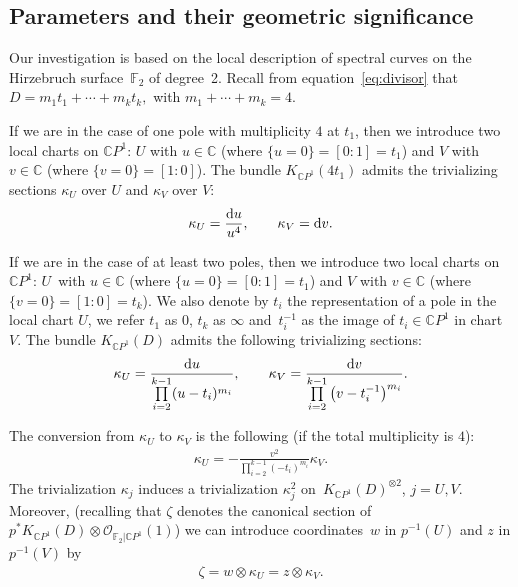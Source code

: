 \documentclass[10pt,a4paper]{amsart}
\newcommand{\C}{{\mathbb C}} %
\renewcommand{\O}{{\mathcal O}} %
\newcommand{\CP}[1]{\mathbb{C}P^{#1}} %
\renewcommand{\d}{{\rm d}} %
\numberwithin{equation}{section}
\begin{document}
\subsection{Parameters and their geometric significance}\label{ssec:param_geo}
Our investigation is based on the local description of spectral
curves on the Hirzebruch surface~{${\mathbb {F}}_2$} of degree~2.
Recall from equation~\eqref{eq:divisor} that
$D = m_1 t_1 + \cdots + m_k t_k,$ with $ m_1 + \cdots + m_k = 4$.

If we are in the case of one pole with multiplicity $4$ {at
 $t_1$}, then we introduce two local charts on $\CP{1}$: $U$ with $u\in
\C$ (where $\{u=0\}=[0:1]=t_1$) and $V$ with $v \in \C$ (where $\{
v=0\}=[1:0]$). The bundle $K_{\CP{1}}(4t_1)$ admits the trivializing
sections $\kappa_U$ over $U$ and $\kappa_V$ over $V$:
\begin{align*}
 \kappa_U = \frac{\d u}{u^4}, \qquad 	\kappa_V = \d v.
\end{align*}

If we are in the case of at least two poles, then we introduce
 two local charts on $\CP{1}$: $U$~with $u\in \C$ (where
 $\{u=0\}=[0:1]=t_1$) and $V$ with $v \in \C$ (where $\{
 v=0\}=[1:0]=t_k$). We also denote by $t_i$ the representation
	of a pole in the local chart $U$, we refer $t_1$ as $0$, $t_k$ as
	$\infty$ and~$t_i^{-1}$ as the image of $t_i\in\CP{1}$ in chart $V$.
	The bundle $K_{\CP{1}}(D)$ admits the following
 trivializing sections:
\begin{gather*}
 \kappa_U = \frac{\d u}{\prod\limits_{i=2}^{k-1}(u-t_i)^{m_i}}, \qquad
	\kappa_V = \frac{\d v}{\prod\limits_{i=2}^{k-1}\big(v-t_i^{-1}\big)^{m_i}}.
\end{gather*}

The conversion from $\kappa_U$ to $\kappa_V$ is the following (if the total multiplicity is $4$):
\begin{gather*}
	{\kappa_U=-\frac{v^2}{\prod\limits_{i=2}^{k-1}(-t_i)^{m_i}} \kappa_V.}
\end{gather*}
The trivialization $\kappa_j$ induces a trivialization $\kappa_j^2$ on~$K_{\CP{1}}(D)^{\otimes 2}$, $j=U,V$.
Moreover, (recalling that $\zeta$ denotes the canonical section of $p^* K_{\CP1}(D) \otimes \O_{{\mathbb {F}}_2 | \CP1}(1)$) we can introduce
coordinates~$w$ in $p^{-1}(U)$ and $z$ in $p^{-1}(V)$ by
\begin{gather}	\label{eq:w-coord}
	\zeta=w\otimes \kappa_U=z\otimes \kappa_V.
\end{gather}
\end{document}

